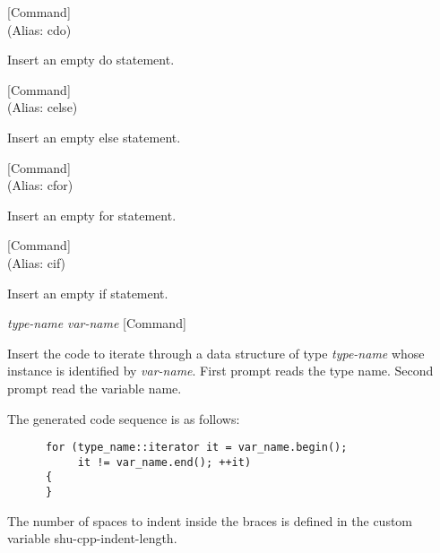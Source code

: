 \vspace{1em}
\noindent
{}
\usebox{\funcname}
 \hfill [Command]\\%
 (Alias: cdo)

\begin{doc-string}
Insert an empty do statement.
\end{doc-string}

\vspace{1em}
\noindent
{}
\usebox{\funcname}
 \hfill [Command]\\%
 (Alias: celse)

\begin{doc-string}
Insert an empty else statement.
\end{doc-string}

\vspace{1em}
\noindent
{}
\usebox{\funcname}
 \hfill [Command]\\%
 (Alias: cfor)

\begin{doc-string}
Insert an empty for statement.
\end{doc-string}

\vspace{1em}
\noindent
{}
\usebox{\funcname}
 \hfill [Command]\\%
 (Alias: cif)

\begin{doc-string}
Insert an empty if statement.
\end{doc-string}

\vspace{1em}
\noindent
{}
\usebox{\funcname}\emph{type-name} \emph{var-name}
 \hfill [Command]

\begin{doc-string}
Insert the code to iterate through a data structure of type \emph{type-name} whose
instance is identified by \emph{var-name}.  First prompt reads the type name.  Second
prompt read the variable name.

The generated code sequence is as follows:

\small{\begin{verbatim}
      for (type_name::iterator it = var_name.begin();
           it != var_name.end(); ++it)
      {
      }
\end{verbatim}}

The number of spaces to indent inside the braces is defined in the custom
variable shu-cpp-indent-length.
\end{doc-string}


